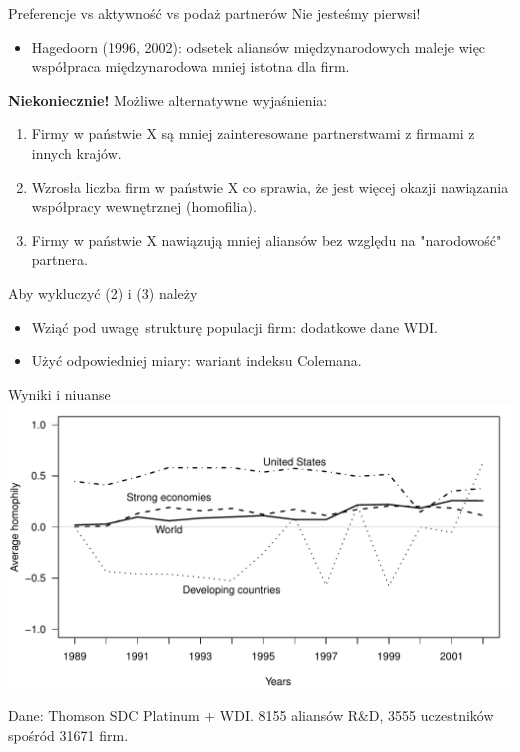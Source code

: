 \documentclass{beamer}
\renewcommand{\emph}[1]{\textbf{#1}}
\begin{document}
\begin{frame}{Preferencje vs aktywność vs podaż partnerów}
	Nie jesteśmy pierwsi!
	\begin{itemize}
		\item Hagedoorn (1996, 2002): odsetek aliansów międzynarodowych maleje więc
			współpraca międzynarodowa mniej istotna dla firm.
	\end{itemize}

	\emph{Niekoniecznie!} Możliwe alternatywne wyjaśnienia:
	\begin{footnotesize}
		\begin{enumerate}
			\item Firmy w państwie X są mniej zainteresowane partnerstwami z firmami z
				innych krajów.
			\item Wzrosła liczba firm w państwie X co sprawia, że jest więcej okazji
				nawiązania współpracy wewnętrznej (homofilia).
			\item Firmy w państwie X nawiązują mniej aliansów bez względu na "narodowość"
				partnera.
		\end{enumerate}
	\end{footnotesize}
	Aby wykluczyć (2) i (3) należy
	\begin{itemize}
		\item Wziąć pod uwagę strukturę populacji firm: dodatkowe dane WDI.
		\item Użyć odpowiedniej miary: wariant indeksu Colemana.
	\end{itemize}
\end{frame}


\begin{frame}{Wyniki i niuanse}
	\centering\includegraphics[width=\textwidth]{figure2}

	Dane: Thomson SDC Platinum + WDI.
	8155 aliansów R\&D, 3555 uczestników spośród 31671 firm.
\end{frame}
\end{document}
